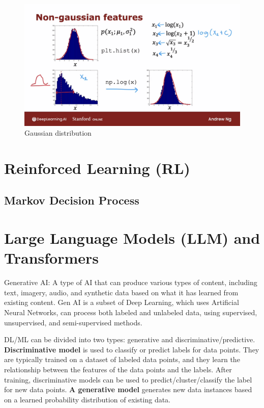 \documentclass[12pt]{report}
\begin{document}
\begin{figure}[H]
  \centering
  \includegraphics[trim =0.0cm 0.0cm 0.0cm 0.0cm, clip, scale=0.15]{pics/convertToGaussian.png}
  \caption{Gaussian distribution}
\end{figure}




\chapter[Reinforced Learning]{Reinforced Learning (RL)}

\section{Markov Decision Process}

\chapter[Large Language Models (LLM) and Transformers]{Large Language Models (LLM) and Transformers}

Generative AI: A type of AI that can produce various types of content, including text, imagery, audio, and synthetic data based on what it has learned from existing content. Gen AI is a subset of Deep Learning, which uses Artificial Neural Networks, can process both labeled and unlabeled data, using supervised, unsupervised, and semi-supervised methods.


DL/ML can be divided into two types: generative and discriminative/predictive. \textbf{Discriminative model} is used to classify or predict labels for data points. They are typically trained on a dataset of labeled data points, and they learn the relationship between the features of the data points and the labels. After training, discriminative models can be used to predict/cluster/classify  the label for new data points. \textbf{A generative model }generates new data instances based on a learned probability distribution of existing data.
\end{document}

